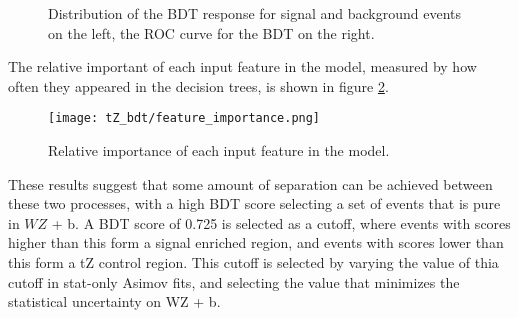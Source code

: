 \begin{figure}[H] 
\center
    \caption{Distribution of the BDT response for signal and background events on the left, the ROC curve for the BDT on the right.}
    \label{fig:tZ_bdt}
\end{figure}

The relative important of each input feature in the model, measured by how often they appeared in the decision trees, is shown in figure \ref{fig:tZ_fImp}.

\begin{figure}[H] 
\center
        \texttt{[image: tZ\_bdt/feature\_importance.png]}
        \caption{Relative importance of each input feature in the model.}
        \label{fig:tZ_fImp}
\end{figure}

These results suggest that some amount of separation can be achieved between these two processes, with a high BDT score selecting a set of events that is pure in $WZ$ + b. A BDT score of 0.725 is selected as a cutoff, where events with scores higher than this form a signal enriched region, and events with scores lower than this form a tZ control region. This cutoff is selected by varying the value of thia cutoff in stat-only Asimov fits, and selecting the value that minimizes the statistical uncertainty on WZ + b.

